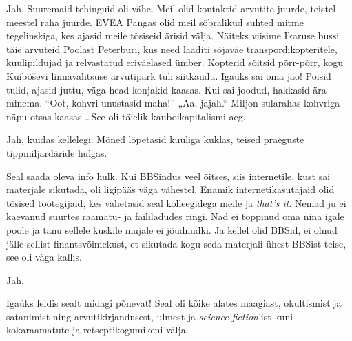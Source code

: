 
Jah. Suuremaid tehinguid oli vähe. Meil olid kontaktid arvutite juurde, 
teistel meestel raha juurde. 
EVEA Pangas olid meil sõbralikud suhted mitme tegelinskiga, kes 
ajasid meile tõsiseid ärisid välja. Näiteks viisime Ikaruse 
bussi täie arvuteid Poolast Peterburi, kus need laaditi
sõjaväe transpordikopteritele, kuulipildujad ja relvastatud eriväelased ümber. Kopterid sõitsid põrr-põrr, kogu 
Kuibõševi linnavalitsuse arvutipark tuli siitkaudu. Igaüks sai oma jao! 
Poisid tulid, ajasid juttu, väga head konjakid kaasas. Kui sai joodud, 
hakkasid ära minema. \enquote{Oot, kohvri unustasid maha!} „Aa, jajah.“ Miljon 
sularahas kohvriga näpu otsas kaasas \ldots See oli täielik
kauboikapitalismi aeg. 


Jah, kuidas kellelegi. Mõned lõpetasid kuuliga kuklas, teised 
praeguste tippmiljardäride hulgas. 


Seal saada oleva info hulk. Kui BBSindus veel õitses, siis internetile, kust 
sai materjale sikutada, oli ligipääs väga vähestel. Enamik internetikasutajaid olid tõsised töötegijaid, kes vahetasid seal 
kolleegidega meile ja \emph{that's it}. Nemad ju ei kaevanud 
suurtes raamatu- ja faililadudes ringi. Nad ei 
toppinud oma nina igale poole ja tänu sellele kuskile mujale ei jõudnudki. Ja 
kellel olid BBSid, ei olnud jälle sellist finantsvõimekust, et sikutada kogu 
seda materjali ühest BBSist teise, see oli väga kallis.


Jah.


Igaüks leidis sealt midagi põnevat! Seal oli kõike alates maagiast, 
okultismist ja satanimist ning arvutikirjandusest, ulmest ja \emph{science 
fiction}'ist kuni kokaraamatute ja retseptikogumikeni välja.


